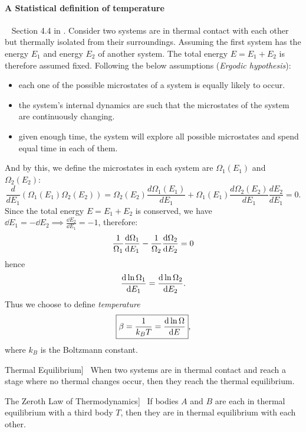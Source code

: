 \documentclass[UTF8]{book}
\newenvironment{theorem}[2][Theorem]{\begin{trivlist}
\item[\hskip \labelsep {\bfseries #1}\hskip \labelsep {\bfseries }]}{\end{trivlist}}
\begin{document}
\paragraph{A Statistical definition of temperature}
~ Section 4.4 in \cite{blundell2009concepts}. Consider two systems are in thermal contact with each other but thermally isolated from their surroundings. Assuming the first system has the energy $E_1$ and energy $E_2$ of another system. The total energy $E=E_1+E_2$ is therefore assumed fixed. Following the below assumptions (\textsl{Ergodic hypothesis}):
\begin{itemize}
\item  {each one of the possible microstates of a system is equally likely to occur.}
\item  {the system's internal dynamics are such that the microstates of the system are continuously changing.}
\item  {given enough time, the system will explore all possible microstates and spend equal time in each of them.}
\end{itemize}

And by this, we define the microstates in each system are $\Omega _1(E_1)$ and $\Omega _2(E_2)$:
$$\dfrac{d}{dE_1}(\Omega _1(E_1)\Omega _2(E_2))=\Omega _2(E_2)\dfrac{d\Omega _1(E_1)}{dE_1}+\Omega _1(E_1)\dfrac{d\Omega _2(E_2)}{dE_1}\dfrac{dE_2}{dE_1}=0.$$
Since the total energy $E=E_1+E_2$ is conserved, we have $\dd{E_1}=-\dd{E_2}
 \implies \frac{\dd{E_2}}{\dd{E_1}}=-1$, therefore:
$$ \frac{1}{\Omega _1}\dv{\Omega _1}{E_1}-\frac{1}{\Omega _2}\dv{\Omega _2}{E_2}=0$$
hence
\[\dv{\ln \Omega _1}{E_1}=\dv{\ln \Omega _2}{E_2}.\]
Thus we choose to define \emph{temperature}
$$\boxed{\beta=\dfrac{1}{k_BT}=\dv{\ln \Omega }{E}},$$
where $k_B$ is the Boltzmann constant.

\begin{theorem}
[Thermal Equilibrium]~  {When two systems are in thermal contact and reach a stage where no thermal changes occur, then they reach the thermal equilibrium.}
\end{theorem}

\begin{theorem}
[The Zeroth Law of Thermodynamics]~ If bodies $A$ and $B$ are each in thermal equilibrium with a third body $T$, then they are in thermal equilibrium with each other.
\end{theorem}
\end{document}
